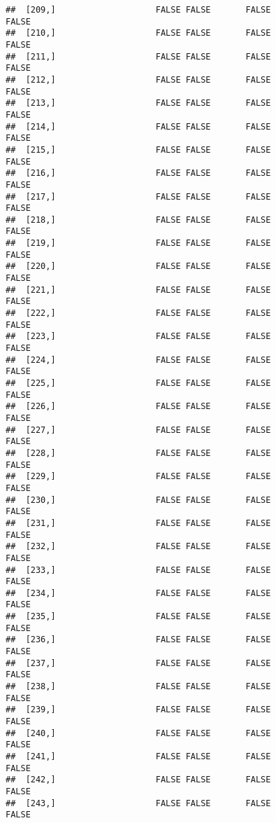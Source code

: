 \documentclass[
]{article}
\begin{document}
\begin{verbatim}
##  [209,]                    FALSE FALSE       FALSE                FALSE
##  [210,]                    FALSE FALSE       FALSE                FALSE
##  [211,]                    FALSE FALSE       FALSE                FALSE
##  [212,]                    FALSE FALSE       FALSE                FALSE
##  [213,]                    FALSE FALSE       FALSE                FALSE
##  [214,]                    FALSE FALSE       FALSE                FALSE
##  [215,]                    FALSE FALSE       FALSE                FALSE
##  [216,]                    FALSE FALSE       FALSE                FALSE
##  [217,]                    FALSE FALSE       FALSE                FALSE
##  [218,]                    FALSE FALSE       FALSE                FALSE
##  [219,]                    FALSE FALSE       FALSE                FALSE
##  [220,]                    FALSE FALSE       FALSE                FALSE
##  [221,]                    FALSE FALSE       FALSE                FALSE
##  [222,]                    FALSE FALSE       FALSE                FALSE
##  [223,]                    FALSE FALSE       FALSE                FALSE
##  [224,]                    FALSE FALSE       FALSE                FALSE
##  [225,]                    FALSE FALSE       FALSE                FALSE
##  [226,]                    FALSE FALSE       FALSE                FALSE
##  [227,]                    FALSE FALSE       FALSE                FALSE
##  [228,]                    FALSE FALSE       FALSE                FALSE
##  [229,]                    FALSE FALSE       FALSE                FALSE
##  [230,]                    FALSE FALSE       FALSE                FALSE
##  [231,]                    FALSE FALSE       FALSE                FALSE
##  [232,]                    FALSE FALSE       FALSE                FALSE
##  [233,]                    FALSE FALSE       FALSE                FALSE
##  [234,]                    FALSE FALSE       FALSE                FALSE
##  [235,]                    FALSE FALSE       FALSE                FALSE
##  [236,]                    FALSE FALSE       FALSE                FALSE
##  [237,]                    FALSE FALSE       FALSE                FALSE
##  [238,]                    FALSE FALSE       FALSE                FALSE
##  [239,]                    FALSE FALSE       FALSE                FALSE
##  [240,]                    FALSE FALSE       FALSE                FALSE
##  [241,]                    FALSE FALSE       FALSE                FALSE
##  [242,]                    FALSE FALSE       FALSE                FALSE
##  [243,]                    FALSE FALSE       FALSE                FALSE

\end{verbatim}
\end{document}
